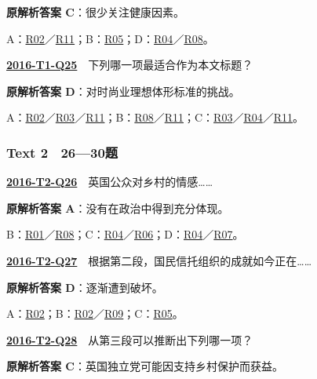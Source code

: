 \documentclass[11pt,a4paper]{article}
\begin{document}
\noindent\textbf{原解析答案 C}：很少关注健康因素。\par\nopagebreak
\noindent A：\hyperref[cat-R02]{R02}／\hyperref[cat-R11]{R11}；B：\hyperref[cat-R05]{R05}；D：\hyperref[cat-R04]{R04}／\hyperref[cat-R08]{R08}。\par\smallskip
{}\label{idx-2016-T1-Q25}\noindent\textbf{\href{https://zj139.github.io/math-notes/english/199237d5df9b8cc835b3f5e8/\#q25}{2016-T1-Q25}}　下列哪一项最适合作为本文标题？\par\nopagebreak
\noindent\textbf{原解析答案 D}：对时尚业理想体形标准的挑战。\par\nopagebreak
\noindent A：\hyperref[cat-R02]{R02}／\hyperref[cat-R03]{R03}／\hyperref[cat-R11]{R11}；B：\hyperref[cat-R08]{R08}／\hyperref[cat-R11]{R11}；C：\hyperref[cat-R03]{R03}／\hyperref[cat-R04]{R04}／\hyperref[cat-R11]{R11}。\par\smallskip
{}\subsubsection{Text 2　26—30题}
\label{idx-2016-T2-Q26}\noindent\textbf{\href{https://zj139.github.io/math-notes/english/cace2d57f6e764744affd357/\#q26}{2016-T2-Q26}}　英国公众对乡村的情感……\par\nopagebreak
\noindent\textbf{原解析答案 A}：没有在政治中得到充分体现。\par\nopagebreak
\noindent B：\hyperref[cat-R01]{R01}／\hyperref[cat-R08]{R08}；C：\hyperref[cat-R04]{R04}／\hyperref[cat-R06]{R06}；D：\hyperref[cat-R04]{R04}／\hyperref[cat-R07]{R07}。\par\smallskip
{}\label{idx-2016-T2-Q27}\noindent\textbf{\href{https://zj139.github.io/math-notes/english/cace2d57f6e764744affd357/\#q27}{2016-T2-Q27}}　根据第二段，国民信托组织的成就如今正在……\par\nopagebreak
\noindent\textbf{原解析答案 D}：逐渐遭到破坏。\par\nopagebreak
\noindent A：\hyperref[cat-R02]{R02}；B：\hyperref[cat-R02]{R02}／\hyperref[cat-R09]{R09}；C：\hyperref[cat-R05]{R05}。\par\smallskip
{}\label{idx-2016-T2-Q28}\noindent\textbf{\href{https://zj139.github.io/math-notes/english/cace2d57f6e764744affd357/\#q28}{2016-T2-Q28}}　从第三段可以推断出下列哪一项？\par\nopagebreak
\noindent\textbf{原解析答案 C}：英国独立党可能因支持乡村保护而获益。\par\nopagebreak
\end{document}
